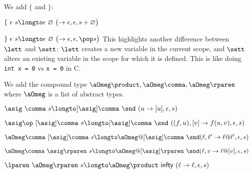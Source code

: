 We add $\lbrace$ and $\rbrace$:
\blist
    \item $\lbrace\ \epsilon\ s\longto \epsilon\ \varnothing\ \bigl(\to \epsilon,\epsilon,s+\varnothing\bigr)$
    \item $\rbrace\ \epsilon\ s\longto \epsilon\ \varnothing\ \bigl(\to \epsilon,\epsilon,\pop s\bigr)$
\elist
This highlights another difference between $\lett$ and $\sett$: $\lett$ creates a new variable in the current scope, and $\sett$ alters an existing variable in the scope for which it is defined.
This is like doing {\tt int x = 0} vs {\tt x = 0} in C.

We add the compound type $\aOmeg\product,\aOmeg\comma,\aOmeg\rparen$ where $\aOmeg$ is a list of abstract types.
\blist
    \item $\asig\ \comma\ s\longto [\asig]\comma\ \snd\ (u\to [u],\epsilon,s)$
    \item $\asig\op\ [\asig]\comma\ s\longto [\asig]\comma\ \snd\ ((f,u),[v]\to f(u,v), \epsilon,s)$
    \item $\aOmeg\comma\ [\asig]\comma\ s\longto \aOmeg @[\asig]\comma\ \snd(\ell,\ell'\to\ell @\ell',\epsilon,s)$
    \item $\aOmeg\comma\ \asig\rparen\ s\longto \aOmeg @[\asig]\rparen\ \snd(\ell,v\to\ell @[v],\epsilon,s)$
    \item $\lparen\ \aOmeg\rparen\ s\longto \aOmeg\product\ {\sf infty}\ (\ell\to\ell,\epsilon,s)$
\elist

